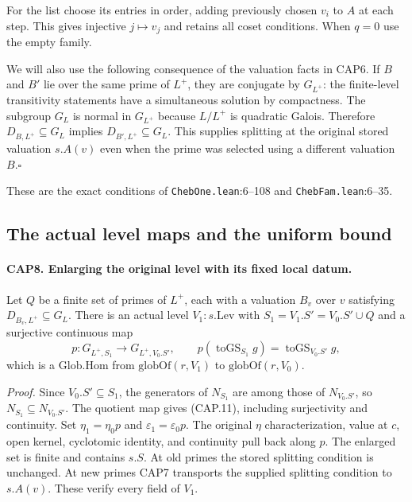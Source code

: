 For the list choose its entries in order, adding previously chosen
$v_i$ to $A$ at each step.  This gives injective $j\mapsto v_j$ and
retains all coset conditions.  When $q=0$ use the empty family.

We will also use the following consequence of the valuation facts
in CAP6.  If $B$ and $B'$ lie over the same prime of $L^+$, they are
conjugate by $G_{L^+}$: the finite-level transitivity statements have
a simultaneous solution by compactness.  The subgroup $G_L$ is
normal in $G_{L^+}$ because $L/L^+$ is quadratic Galois.  Therefore
$D_{B,L^+}\subseteq G_L$ implies
$D_{B',L^+}\subseteq G_L$.  This supplies splitting at the original
stored valuation $s.A(v)$ even when the prime was selected using a
different valuation $B$.\hfill$\square$

These are the exact conditions of \nolinkurl{ChebOne.lean}:6--108 and
\nolinkurl{ChebFam.lean}:6--35.

\subsection{The actual level maps and the uniform bound}

\paragraph{CAP8. Enlarging the original level with its fixed local datum.}
\label{claim:CAP8}
Let $Q$ be a finite set of primes of $L^+$, each with a valuation
$B_v$ over $v$ satisfying $D_{B_v,L^+}\subseteq G_L$.  There is an
actual level $V_1:s.\mathrm{Lev}$ with
$S_1=V_1.S'=V_0.S'\cup Q$ and a surjective continuous map
\[
 p:G_{L^+,S_1}\longrightarrow G_{L^+,V_0.S'},\qquad
 p(\operatorname{toGS}_{S_1}g)=\operatorname{toGS}_{V_0.S'}g,
 \tag{CAP.11}
\]
which is a $\mathrm{Glob.Hom}$ from
$\mathrm{globOf}(r,V_1)$ to $\mathrm{globOf}(r,V_0)$.

\emph{Proof.}
Since $V_0.S'\subseteq S_1$, the generators of $N_{S_1}$ are among
those of $N_{V_0.S'}$, so $N_{S_1}\subseteq N_{V_0.S'}$.
The quotient map gives (CAP.11), including surjectivity and continuity.
Set $\eta_1=\eta_0p$ and $\varepsilon_1=\varepsilon_0p$.
The original $\eta$ characterization, value at $c$, open kernel,
cyclotomic identity, and continuity pull back along $p$.
The enlarged set is finite and contains $s.S$.  At old primes the
stored splitting condition is unchanged.  At new primes CAP7
transports the supplied splitting condition to $s.A(v)$.
These verify every field of $V_1$.


